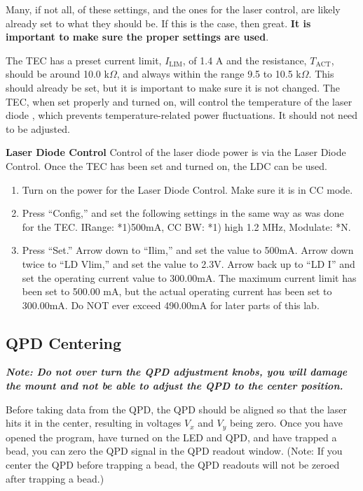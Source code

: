 \documentclass{../lab}
\begin{document}
Many, if not all, of these settings, and the ones for the laser control, are likely already set to what they should be. If this is the case, then great. \textbf{It is important to make sure the proper settings are used}.

The TEC has a preset current limit, $I_\text{LIM}$, of 1.4 A and the resistance, $T_\text{ACT}$, should be around 10.0 k$\Omega$, and always within the range 9.5 to 10.5 k$\Omega$. This should already be set, but it is important to make sure it is not changed. The TEC, when set properly and turned on, will control the temperature of the laser diode , which prevents temperature-related power fluctuations. It should not need to be adjusted.

\textbf{Laser Diode Control} Control of the laser diode power is via the Laser Diode Control. Once the TEC has been set and turned on, the LDC can be used.

\begin{enumerate}
    \item Turn on the power for the Laser Diode Control. Make sure it is in CC mode.

    \item Press ``Config,'' and set the following settings in the same way as was done for the TEC. IRange: *1)500mA, CC BW: *1) high 1.2 MHz, Modulate: *N.

    \item Press ``Set.'' Arrow down to ``Ilim,'' and set the value to 500mA. Arrow down twice to ``LD Vlim,'' and set the value to 2.3V. Arrow back up to ``LD I'' and set the operating current value to 300.00mA. The maximum current limit has been set to 500.00 mA, but the actual operating current has been set to 300.00mA. Do NOT ever exceed 490.00mA for later parts of this lab.
\end{enumerate}

\subsection{QPD Centering}

\emph{\textbf{Note: Do not over turn the QPD adjustment knobs, you will damage the mount and not be able to adjust the QPD to the center position.}}

Before taking data from the QPD, the QPD should be aligned so that the laser hits it in the center, resulting in voltages $V_x$ and $V_y$ being zero. Once you have opened the program, have turned on the LED and QPD, and have trapped a bead, you can zero the QPD signal in the QPD readout window. (Note: If you center the QPD before trapping a bead, the QPD readouts will not be zeroed after trapping a bead.)
\end{document}
